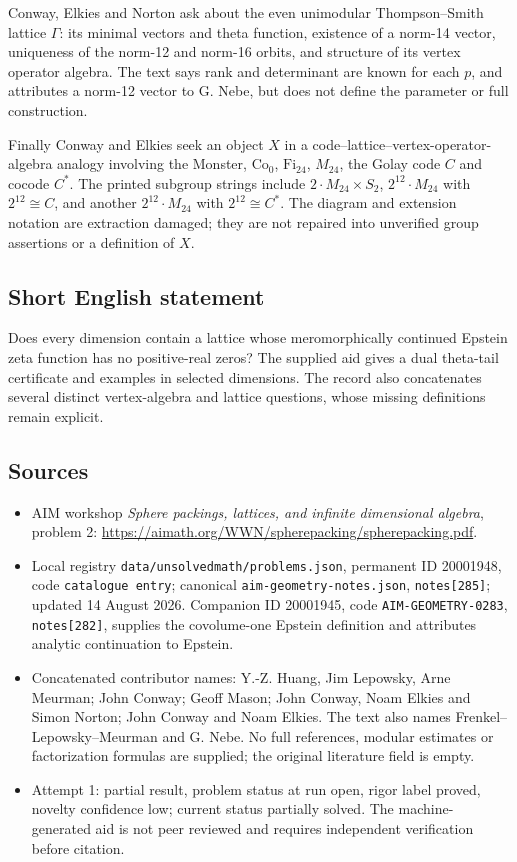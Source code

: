 \documentclass[11pt]{article}
\begin{document}
Conway, Elkies and Norton ask about the even unimodular Thompson--Smith lattice \(\Gamma\): its minimal vectors and theta function, existence of a norm-14 vector, uniqueness of the norm-12 and norm-16 orbits, and structure of its vertex operator algebra. The text says rank and determinant are known for each \(p\), and attributes a norm-12 vector to G. Nebe, but does not define the parameter or full construction.

Finally Conway and Elkies seek an object \(X\) in a code--lattice--vertex-operator-algebra analogy involving the Monster, \(\mathrm{Co}_0\), \(\mathrm{Fi}_{24}\), \(M_{24}\), the Golay code \(C\) and cocode \(C^*\). The printed subgroup strings include \(2\cdot M_{24}\times S_2\), \(2^{12}\cdot M_{24}\) with \(2^{12}\cong C\), and another \(2^{12}\cdot M_{24}\) with \(2^{12}\cong C^*\). The diagram and extension notation are extraction damaged; they are not repaired into unverified group assertions or a definition of \(X\).
\subsection{Short English statement}
Does every dimension contain a lattice whose meromorphically continued Epstein zeta function has no positive-real zeros? The supplied aid gives a dual theta-tail certificate and examples in selected dimensions. The record also concatenates several distinct vertex-algebra and lattice questions, whose missing definitions remain explicit.
\subsection{Sources}
\begin{itemize}
\item AIM workshop \emph{Sphere packings, lattices, and infinite dimensional algebra}, problem 2: \url{https://aimath.org/WWN/spherepacking/spherepacking.pdf}.
\item Local registry \texttt{data/unsolvedmath/problems.json}, permanent ID 20001948, code \texttt{catalogue entry}; canonical \texttt{aim-geometry-notes.json}, \texttt{notes[285]}; updated 14 August 2026. Companion ID 20001945, code \texttt{AIM-GEOMETRY-0283}, \texttt{notes[282]}, supplies the covolume-one Epstein definition and attributes analytic continuation to Epstein.
\item Concatenated contributor names: Y.-Z. Huang, Jim Lepowsky, Arne Meurman; John Conway; Geoff Mason; John Conway, Noam Elkies and Simon Norton; John Conway and Noam Elkies. The text also names Frenkel--Lepowsky--Meurman and G. Nebe. No full references, modular estimates or factorization formulas are supplied; the original literature field is empty.
\item Attempt 1: partial result, problem status at run open, rigor label proved, novelty confidence low; current status partially solved. The machine-generated aid is not peer reviewed and requires independent verification before citation.
\end{itemize}
\end{document}
